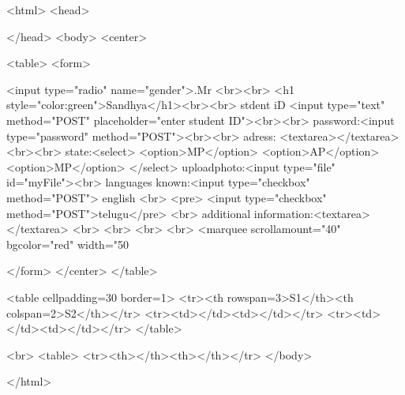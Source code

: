 <html>
<head>

</head>
<body>
<center>

<table>
<form>

<input type="radio" name="gender">.Mr <br><br>
<h1 style="color:green">Sandhya</h1><br><br>
stdent iD <input type="text" method="POST" placeholder="enter student ID"><br><br> 
password:<input type="password" method="POST"><br><br>
adress:
<textarea></textarea><br><br>
state:<select>
<option>MP</option>
<option>AP</option>
<option>MP</option>
</select>
uploadphoto:<input type="file" id="myFile"><br>
languages known:<input type="checkbox" method="POST"> english <br>
<pre>               <input type="checkbox" method="POST">telugu</pre>
<br>
additional information:<textarea></textarea>
<br>
<br>
<br>
<br>
<marquee scrollamount="40" bgcolor="red" width="50%


</form>
</center>
</table>

<table cellpadding=30  border=1>
<tr><th rowspan=3>S1</th><th colspan=2>S2</th></tr>
<tr><td></td><td></td></tr>
<tr><td></td><td></td></tr>
</table>

<br>
<table>
<tr><th></th><th></th></tr>
</body>

</html>